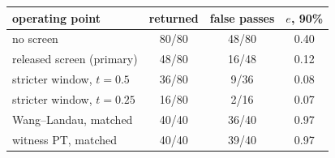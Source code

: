 \begin{tabular}{lccc}
\toprule
operating point & returned & false passes & $e$, 90\% \\
\midrule
no screen & 80/80 & 48/80 & 0.40 \\
released screen (primary) & 48/80 & 16/48 & 0.12 \\
stricter window, $t{=}0.5$ & 36/80 & 9/36 & 0.08 \\
stricter window, $t{=}0.25$ & 16/80 & 2/16 & 0.07 \\
\midrule
Wang--Landau, matched & 40/40 & 36/40 & 0.97 \\
witness PT, matched & 40/40 & 39/40 & 0.97 \\
\bottomrule
\end{tabular}
